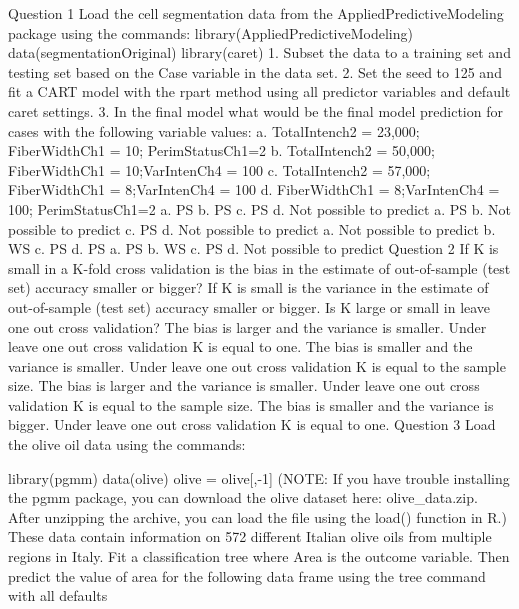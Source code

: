 Question 1
Load the cell segmentation data from the AppliedPredictiveModeling package using the commands:
library(AppliedPredictiveModeling)
data(segmentationOriginal)
library(caret)
1. Subset the data to a training set and testing set based on the Case variable in the data set. 
2. Set the seed to 125 and fit a CART model with the rpart method using all predictor variables and default caret settings. 
3. In the final model what would be the final model prediction for cases with the following variable values:
a. TotalIntench2 = 23,000; FiberWidthCh1 = 10; PerimStatusCh1=2 
b. TotalIntench2 = 50,000; FiberWidthCh1 = 10;VarIntenCh4 = 100 
c. TotalIntench2 = 57,000; FiberWidthCh1 = 8;VarIntenCh4 = 100 
d. FiberWidthCh1 = 8;VarIntenCh4 = 100; PerimStatusCh1=2 
a. PS 
b. PS 
c. PS
d. Not possible to predict 
 a. PS 
b. Not possible to predict 
c. PS
d. Not possible to predict 
 a. Not possible to predict 
b. WS 
c. PS
d. PS 
 a. PS 
b. WS 
c. PS
d. Not possible to predict 
Question 2
If K is small in a K-fold cross validation is the bias in the estimate of out-of-sample (test set) accuracy smaller or bigger? If K is small is the variance in the estimate of out-of-sample (test set) accuracy smaller or bigger. Is K large or small in leave one out cross validation?
The bias is larger and the variance is smaller. Under leave one out cross validation K is equal to one.
The bias is smaller and the variance is smaller. Under leave one out cross validation K is equal to the sample size.
The bias is larger and the variance is smaller. Under leave one out cross validation K is equal to the sample size.
The bias is smaller and the variance is bigger. Under leave one out cross validation K is equal to one.
Question 3
Load the olive oil data using the commands:

library(pgmm)
data(olive)
olive = olive[,-1]
(NOTE: If you have trouble installing the pgmm package, you can download the olive dataset here: olive_data.zip. After unzipping the archive, you can load the file using the load() function in R.)
These data contain information on 572 different Italian olive oils from multiple regions in Italy. Fit a classification tree where Area is the outcome variable. Then predict the value of area for the following data frame using the tree command with all defaults


